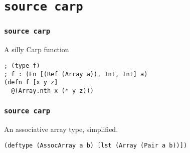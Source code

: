 \documentclass[aspectratio=169]{beamer}
\begin{document}
  \section{\texttt{source carp}}
  \begin{frame}[fragile]
  \frametitle{\texttt{source carp}}
    \begin{listing}[H]
      \caption{A silly Carp function}
      \begin{verbatim}
; (type f)
; f : (Fn [(Ref (Array a)), Int, Int] a)
(defn f [x y z]
  @(Array.nth x (* y z)))
      \end{verbatim}
    \end{listing}
  \end{frame}
  \begin{frame}[fragile]
    \frametitle{\texttt{source carp}}
    \begin{listing}[H]
      \caption{An associative array type, simplified.}
      \begin{verbatim}
(deftype (AssocArray a b) [lst (Array (Pair a b))])
      \end{verbatim}
    \end{listing}
  \end{frame}
\end{document}
